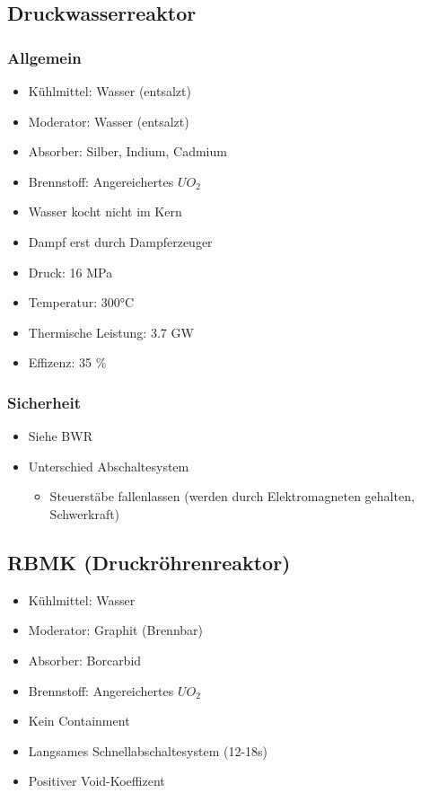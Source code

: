 \documentclass[12pt]{article}
\begin{document}
\subsection{Druckwasserreaktor}

\subsubsection{Allgemein}
\begin{itemize}
  \item Kühlmittel: Wasser (entsalzt)
  \item Moderator: Wasser (entsalzt)
  \item Absorber: Silber, Indium, Cadmium
  \item Brennstoff: Angereichertes \(UO_2\)
  \item Wasser kocht nicht im Kern
  \item Dampf erst durch Dampferzeuger
  \item Druck: 16 MPa
  \item Temperatur: 300°C
  \item Thermische Leistung: 3.7 GW
  \item Effizenz: 35 \%
\end{itemize}

\subsubsection{Sicherheit}
\begin{itemize}
  \item Siehe BWR
  \item Unterschied Abschaltesystem
  \begin{itemize}
    \item Steuerstäbe fallenlassen (werden durch Elektromagneten gehalten, Schwerkraft)
  \end{itemize}
\end{itemize}

\subsection{RBMK (Druckröhrenreaktor)}
\begin{itemize}
  \item Kühlmittel: Wasser
  \item Moderator: Graphit (Brennbar)
  \item Absorber: Borcarbid
  \item Brennstoff: Angereichertes \(UO_2\)
  \item Kein Containment
  \item Langsames Schnellabschaltesystem (12-18s)
  \item Positiver Void-Koeffizent
\end{itemize}
\end{document}
